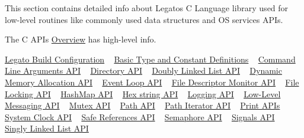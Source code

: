 This section contains detailed info about Legato\textquotesingle{}s C Language library used for low-\/level routines like commonly used data structures and O\+S services A\+P\+Is.





The C A\+P\+Is\textquotesingle{} \hyperlink{c__a_p_is_cApiOverview}{Overview} has high-\/level info.





\hyperlink{c_le_build_cfg}{Legato Build Configuration} ~\newline
 \hyperlink{c_basics}{Basic Type and Constant Definitions} ~\newline
 \hyperlink{c_args}{Command Line Arguments A\+P\+I} ~\newline
 \hyperlink{c_dir}{Directory A\+P\+I} ~\newline
 \hyperlink{c_doublyLinkedList}{Doubly Linked List A\+P\+I} ~\newline
 \hyperlink{c_memory}{Dynamic Memory Allocation A\+P\+I} ~\newline
 \hyperlink{c_eventLoop}{Event Loop A\+P\+I} ~\newline
 \hyperlink{c_fdMonitor}{File Descriptor Monitor A\+P\+I} ~\newline
 \hyperlink{c_flock}{File Locking A\+P\+I} ~\newline
 \hyperlink{c_hashmap}{Hash\+Map A\+P\+I} ~\newline
 \hyperlink{c_hex}{Hex string A\+P\+I} ~\newline
 \hyperlink{c_logging}{Logging A\+P\+I} ~\newline
 \hyperlink{c_messaging}{Low-\/\+Level Messaging A\+P\+I} ~\newline
 \hyperlink{c_mutex}{Mutex A\+P\+I} ~\newline
 \hyperlink{c_path}{Path A\+P\+I} ~\newline
 \hyperlink{c_pathIter}{Path Iterator A\+P\+I} ~\newline
 \hyperlink{c_print}{Print A\+P\+Is} ~\newline
 \hyperlink{c_clock}{System Clock A\+P\+I} ~\newline
 \hyperlink{c_safeRef}{Safe References A\+P\+I} ~\newline
 \hyperlink{c_semaphore}{Semaphore A\+P\+I} ~\newline
 \hyperlink{c_signals}{Signals A\+P\+I} ~\newline
 \hyperlink{c_singlyLinkedList}{Singly Linked List A\+P\+I} ~\newline
